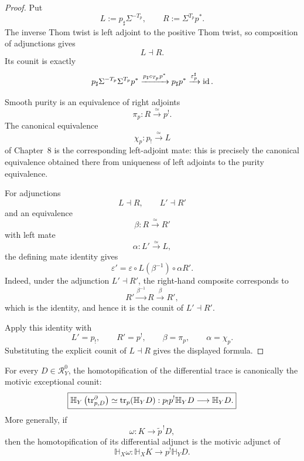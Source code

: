 \begin{proof}
Put
\[
    L:=p_\sharp\Sigma^{-T_p},
    \qquad
    R:=\Sigma^{T_p}p^*.
\]
The inverse Thom twist is left adjoint to the positive Thom twist, so
composition of adjunctions gives
\[
    L\dashv R.
\]
Its counit is exactly
\[
    p_\sharp
    \Sigma^{-T_p}\Sigma^{T_p}p^*
    \xrightarrow{p_\sharp c_{T_p}p^*}
    p_\sharp p^*
    \xrightarrow{\varepsilon_p^\sharp}
    \operatorname{id}.
\]

Smooth purity is an equivalence of right adjoints
\[
    \pi_p:R\xrightarrow{\simeq}p^!.
\]
The canonical equivalence
\[
    \chi_p:p_!\xrightarrow{\simeq}L
\]
of Chapter~8 is the corresponding left-adjoint mate: this is precisely
the canonical equivalence obtained there from uniqueness of left
adjoints to the purity equivalence.

For adjunctions
\[
    L\dashv R,
    \qquad
    L'\dashv R'
\]
and an equivalence
\[
    \beta:R\xrightarrow{\simeq}R'
\]
with left mate
\[
    \alpha:L'\xrightarrow{\simeq}L,
\]
the defining mate identity gives
\[
    \varepsilon'
    =
    \varepsilon
    \circ
    L(\beta^{-1})
    \circ
    \alpha R'.
\]
Indeed, under the adjunction
\(L'\dashv R'\), the right-hand composite corresponds to
\[
    R'
    \xrightarrow{\beta^{-1}}
    R
    \xrightarrow{\beta}
    R',
\]
which is the identity, and hence it is the counit of
\(L'\dashv R'\).

Apply this identity with
\[
    L'=p_!,
    \qquad
    R'=p^!,
    \qquad
    \beta=\pi_p,
    \qquad
    \alpha=\chi_p.
\]
Substituting the explicit counit of \(L\dashv R\) gives the displayed
formula.
\end{proof}

\begin{theorem}
\label{thm:dr-int-motivic-shadow}
For every \(D\in\mathcal R_Y^0\), the homotopification of the differential
trace is canonically the motivic exceptional counit:
\[
\boxed{
    \mathbb H_Y
    \left(
        \operatorname{tr}^{\partial}_{p,D}
    \right)
    \simeq
    \operatorname{tr}_p(\mathbb H_YD):
    p_!p^!\mathbb H_YD
    \longrightarrow
    \mathbb H_YD.
}
\]
More generally, if
\[
    \omega:
    K\longrightarrow\widetilde p^{\,!}D,
\]
then the homotopification of its differential adjunct is the motivic adjunct
of
\[
    \mathbb H_X\omega:
    \mathbb H_XK
    \longrightarrow
    p^!\mathbb H_YD.
\]
\end{theorem}

